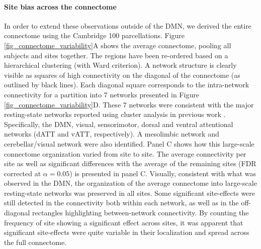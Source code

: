 \documentclass[authoryear]{elsarticle}
\begin{document}
\paragraph{Site bias across the connectome} In order to extend these observations outside of the DMN, we derived the entire connectome using the Cambridge 100 parcellations. Figure \ref{fig_connectome_variability}A shows the average connectome, pooling all subjects and sites together. The regions have been re-ordered based on a hierarchical clustering (with Ward criterion). A network structure is clearly visible as squares of high connectivity on the diagonal of the connectome (as outlined by black lines). Each diagonal square corresponds to the intra-network connectivity for a partition into 7 networks presented in Figure \ref{fig_connectome_variability}D. These 7 networks were consistent with the major resting-state networks reported using cluster analysis in previous work \citep[e.g.,]{Heuvel2008, Bellec2010, Yeo2011, Power2011}. Specifically, the DMN, visual, sensorimotor, dorsal and ventral attentional networks (dATT and vATT, respectively). A mesolimbic network and cerebellar/visual network were also identified. Panel C shows how this large-scale connectome organization varied from site to site. The average connectivity per site as well as significant differences with the average of the remaining sites (FDR corrected at $\alpha=0.05$) is presented in panel C. Visually, consistent with what was observed in the DMN, the organization of the average connectome into large-scale resting-state networks was preserved in all sites. Some significant site-effects were still detected in the connectivity both within each network, as well as in the off-diagonal rectangles highlighting between-network connectivity. By counting the frequency of site showing a significant effect across sites, it was apparent that significant site-effects were quite variable in their localization and spread across the full connectome. 
\end{document}
